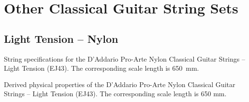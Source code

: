 %
%
%

 \newpage
 \section{Other Classical Guitar String Sets\label{app:specs}}

 \subsection{Light Tension -- Nylon}


 \begin{table}[htbp]
  \centering
  \caption{\label{tbl:ej43_mks} String specifications for the D'Addario Pro-Arte Nylon Classical Guitar Strings -- Light Tension (EJ43). The corresponding scale length is 650~mm.}
  
 \end{table}%

 \begin{table}[htbp]
  \centering
  \caption{\label{tbl:ej43_props} Derived physical properties of the D'Addario Pro-Arte Nylon Classical Guitar Strings -- Light Tension (EJ43). The corresponding scale length is 650 mm.}
  
 \end{table}%

